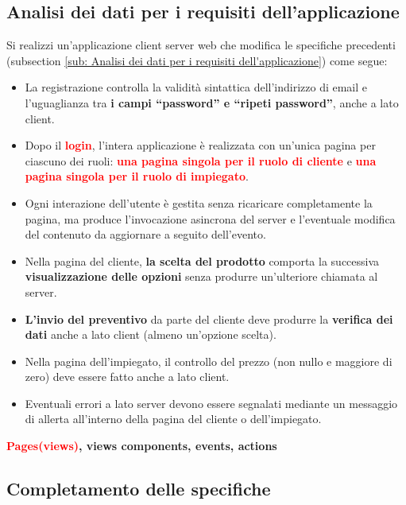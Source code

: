 \documentclass[a4paper, 12pt]{article}
\begin{document}
\subsection{Analisi dei dati per i requisiti dell'applicazione}
Si realizzi un’applicazione client server web che modifica le specifiche precedenti (subsection \ref{sub: Analisi dei dati per i requisiti dell'applicazione}) come segue:
\begin{itemize}
\item La registrazione controlla la validità sintattica dell’indirizzo di email e l’uguaglianza tra \textbf{\textcolor{myGreen}{i campi “password” e “ripeti password”}}, anche a lato client.
\item Dopo il \textbf{\textcolor{red}{login}}, l’intera applicazione è realizzata con un’unica pagina per ciascuno dei ruoli: \textbf{\textcolor{red}{una pagina singola per il ruolo di cliente}} e \textbf{\textcolor{red}{una pagina singola per il ruolo di impiegato}}.
\item Ogni interazione dell’utente è gestita senza ricaricare completamente la pagina, ma produce l’invocazione asincrona del server e l’eventuale modifica del contenuto da aggiornare a seguito dell’evento.
\item Nella pagina del cliente, \textbf{\textcolor{myBlue}{la scelta del prodotto}} comporta la successiva \textbf{\textcolor{myBrown}{visualizzazione delle opzioni}} senza produrre un’ulteriore chiamata al server.
\item \textbf{\textcolor{myBlue}{L’invio del preventivo}} da parte del cliente deve produrre la \textbf{\textcolor{myBrown}{verifica dei dati}} anche a lato client (almeno un’opzione scelta).
\item Nella pagina dell’impiegato, il controllo del prezzo (non nullo e maggiore di zero) deve essere fatto anche a lato client.
\item Eventuali errori a lato server devono essere segnalati mediante un messaggio di allerta all’interno della pagina del cliente o dell’impiegato.\\
\end{itemize}
\noindent \textbf{\textcolor{red}{Pages(views)}, \textcolor{myGreen}{views components}, \textcolor{myBlue}{events}, \textcolor{myBrown}{actions}}
\subsection{Completamento delle specifiche}
\end{document}
